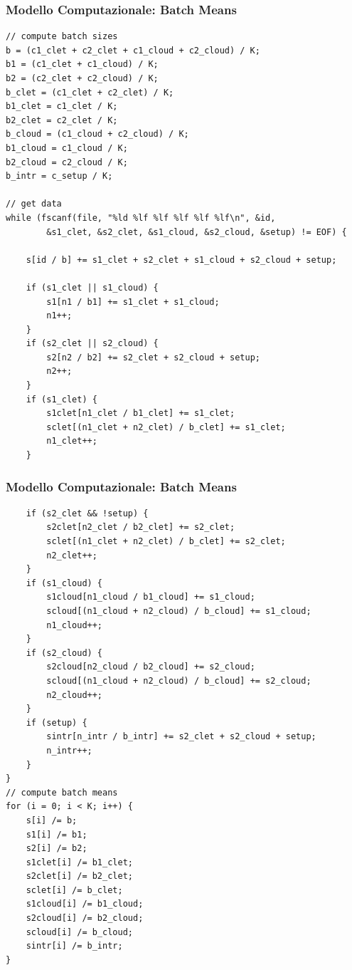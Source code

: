 \begin{frame}[fragile]
\frametitle{Modello Computazionale: Batch Means}
\begin{lstlisting}
// compute batch sizes
b = (c1_clet + c2_clet + c1_cloud + c2_cloud) / K;
b1 = (c1_clet + c1_cloud) / K;
b2 = (c2_clet + c2_cloud) / K;
b_clet = (c1_clet + c2_clet) / K;
b1_clet = c1_clet / K;
b2_clet = c2_clet / K;
b_cloud = (c1_cloud + c2_cloud) / K;
b1_cloud = c1_cloud / K;
b2_cloud = c2_cloud / K;
b_intr = c_setup / K;

// get data
while (fscanf(file, "%ld %lf %lf %lf %lf %lf\n", &id,
        &s1_clet, &s2_clet, &s1_cloud, &s2_cloud, &setup) != EOF) {

    s[id / b] += s1_clet + s2_clet + s1_cloud + s2_cloud + setup;

    if (s1_clet || s1_cloud) {
        s1[n1 / b1] += s1_clet + s1_cloud;
        n1++;
    }
    if (s2_clet || s2_cloud) {
        s2[n2 / b2] += s2_clet + s2_cloud + setup;
        n2++;
    }
    if (s1_clet) {
        s1clet[n1_clet / b1_clet] += s1_clet;
        sclet[(n1_clet + n2_clet) / b_clet] += s1_clet;
        n1_clet++;
    }
\end{lstlisting}
\end{frame}
\begin{frame}[fragile]
\frametitle{Modello Computazionale: Batch Means}
\begin{lstlisting}
    if (s2_clet && !setup) {
        s2clet[n2_clet / b2_clet] += s2_clet;
        sclet[(n1_clet + n2_clet) / b_clet] += s2_clet;
        n2_clet++;
    }
    if (s1_cloud) {
        s1cloud[n1_cloud / b1_cloud] += s1_cloud;
        scloud[(n1_cloud + n2_cloud) / b_cloud] += s1_cloud;
        n1_cloud++;
    }
    if (s2_cloud) {
        s2cloud[n2_cloud / b2_cloud] += s2_cloud;
        scloud[(n1_cloud + n2_cloud) / b_cloud] += s2_cloud;
        n2_cloud++;
    }
    if (setup) {
        sintr[n_intr / b_intr] += s2_clet + s2_cloud + setup;
        n_intr++;
    }
}
// compute batch means
for (i = 0; i < K; i++) {
    s[i] /= b;
    s1[i] /= b1;
    s2[i] /= b2;
    s1clet[i] /= b1_clet;
    s2clet[i] /= b2_clet;
    sclet[i] /= b_clet;
    s1cloud[i] /= b1_cloud;
    s2cloud[i] /= b2_cloud;
    scloud[i] /= b_cloud;
    sintr[i] /= b_intr;
}
\end{lstlisting}
\end{frame}
